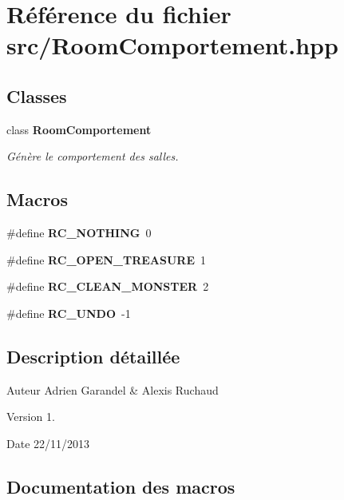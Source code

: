 \section{Référence du fichier src/\-Room\-Comportement.hpp}
\label{_room_comportement_8hpp}
\subsection*{Classes}
\begin{DoxyCompactItemize}
\item 
class {\bf Room\-Comportement}
\begin{DoxyCompactList}\small\item\em Génère le comportement des salles. \end{DoxyCompactList}\end{DoxyCompactItemize}
\subsection*{Macros}
\begin{DoxyCompactItemize}
\item 
\#define {\bf R\-C\-\_\-\-N\-O\-T\-H\-I\-N\-G}~0
\item 
\#define {\bf R\-C\-\_\-\-O\-P\-E\-N\-\_\-\-T\-R\-E\-A\-S\-U\-R\-E}~1
\item 
\#define {\bf R\-C\-\_\-\-C\-L\-E\-A\-N\-\_\-\-M\-O\-N\-S\-T\-E\-R}~2
\item 
\#define {\bf R\-C\-\_\-\-U\-N\-D\-O}~-\/1
\end{DoxyCompactItemize}


\subsection{Description détaillée}
\begin{DoxyAuthor}{Auteur}
Adrien Garandel \& Alexis Ruchaud 
\end{DoxyAuthor}
\begin{DoxyVersion}{Version}
1. 
\end{DoxyVersion}
\begin{DoxyDate}{Date}
22/11/2013 
\end{DoxyDate}


\subsection{Documentation des macros}
